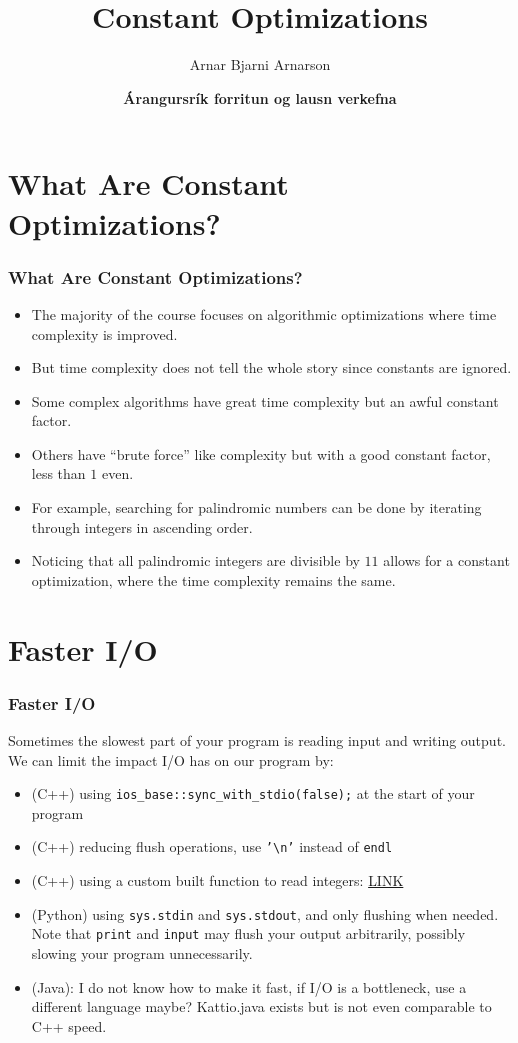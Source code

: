 \documentclass[11pt]{beamer}
\title{Constant Optimizations}
\author{Arnar Bjarni Arnarson}
\institute{\href{http://ru.is/td}{School of Computer Science} \\[2pt] \href{http://ru.is}{Reykjavík University}}
\date{\textbf{Árangursrík forritun og lausn verkefna}}
\begin{document}
\begin{frame}[plain]
    \titlepage
\end{frame}

\section*{What Are Constant Optimizations?}
\begin{frame}[plain]
    \frametitle{What Are Constant Optimizations?}
    \begin{itemize}
        \item The majority of the course focuses on algorithmic optimizations where time complexity is improved.
        \item<2-> But time complexity does not tell the whole story since constants are ignored.
        \item<3-> Some complex algorithms have great time complexity but an awful constant factor.
        \item<4-> Others have ``brute force'' like complexity but with a good constant factor, less than $1$ even.
        \item<5-> For example, searching for palindromic numbers can be done by iterating through integers in ascending order.
        \item<6-> Noticing that all palindromic integers are divisible by $11$ allows for a constant optimization, where the time complexity remains the same.
    \end{itemize}
\end{frame}

\section*{Faster I/O}
\begin{frame}
    \frametitle{Faster I/O}
    Sometimes the slowest part of your program is reading input and writing output.
    We can limit the impact I/O has on our program by:
    \begin{itemize}
        \item<2-> (C++) using \texttt{ios\_base::sync\_with\_stdio(false);} at the start of your program
        \item<3-> (C++) reducing flush operations, use \texttt{'\textbackslash n'} instead of \texttt{endl}
        \item<4-> (C++) using a custom built function to read integers: \href{https://github.com/SuprDewd/CompetitiveProgramming/blob/master/code/tricks/fast_input.cpp}{LINK}
        \item<5-> (Python) using \texttt{sys.stdin} and \texttt{sys.stdout}, and only flushing when needed. Note that \texttt{print} and \texttt{input} may flush your output arbitrarily, possibly slowing your program unnecessarily.
        \item<6-> (Java): I do not know how to make it fast, if I/O is a bottleneck, use a different language maybe? Kattio.java exists but is not even comparable to C++ speed.
    \end{itemize}
\end{frame}
\end{document}
